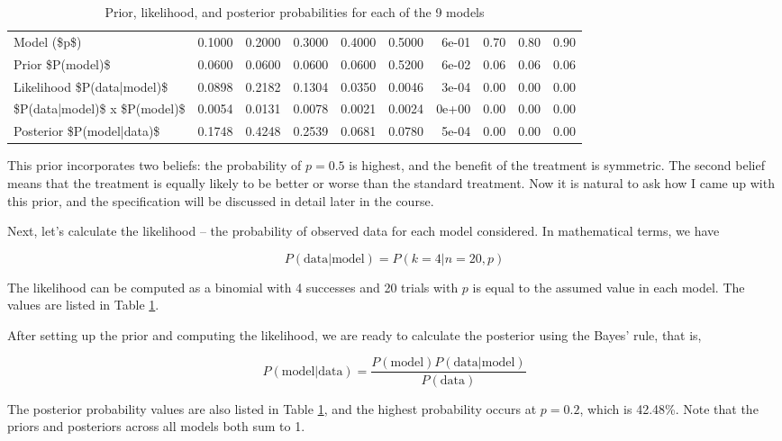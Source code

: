 \documentclass[]{book}
\theoremstyle{definition}
\theoremstyle{definition}
\theoremstyle{definition}
\theoremstyle{remark}
\begin{document}
\begin{table}

\caption{\label{tab:RU-486prior}Prior, likelihood, and posterior probabilities for each of the 9 models}
\centering
\begin{tabular}[t]{lrrrrrrrrr}
\toprule
Model (\$p\$) & 0.1000 & 0.2000 & 0.3000 & 0.4000 & 0.5000 & 6e-01 & 0.70 & 0.80 & 0.90\\
Prior \$P(model)\$ & 0.0600 & 0.0600 & 0.0600 & 0.0600 & 0.5200 & 6e-02 & 0.06 & 0.06 & 0.06\\
Likelihood \$P(data|model)\$ & 0.0898 & 0.2182 & 0.1304 & 0.0350 & 0.0046 & 3e-04 & 0.00 & 0.00 & 0.00\\
\$P(data|model)\$ x \$P(model)\$ & 0.0054 & 0.0131 & 0.0078 & 0.0021 & 0.0024 & 0e+00 & 0.00 & 0.00 & 0.00\\
Posterior \$P(model|data)\$ & 0.1748 & 0.4248 & 0.2539 & 0.0681 & 0.0780 & 5e-04 & 0.00 & 0.00 & 0.00\\
\bottomrule
\end{tabular}
\end{table}

This prior incorporates two beliefs: the probability of \(p = 0.5\) is
highest, and the benefit of the treatment is symmetric. The second
belief means that the treatment is equally likely to be better or worse
than the standard treatment. Now it is natural to ask how I came up with
this prior, and the specification will be discussed in detail later in
the course.

Next, let's calculate the likelihood -- the probability of observed data
for each model considered. In mathematical terms, we have

\[ P(\text{data}|\text{model}) = P(k = 4 | n = 20, p)\]

The likelihood can be computed as a binomial with 4 successes and 20
trials with \(p\) is equal to the assumed value in each model. The
values are listed in Table \ref{tab:RU-486prior}.

After setting up the prior and computing the likelihood, we are ready to
calculate the posterior using the Bayes' rule, that is,

\[P(\text{model}|\text{data}) = \frac{P(\text{model})P(\text{data}|\text{model})}{P(\text{data})}\]

The posterior probability values are also listed in Table
\ref{tab:RU-486prior}, and the highest probability occurs at \(p=0.2\),
which is 42.48\%. Note that the priors and posteriors across all models
both sum to 1.
\end{document}
